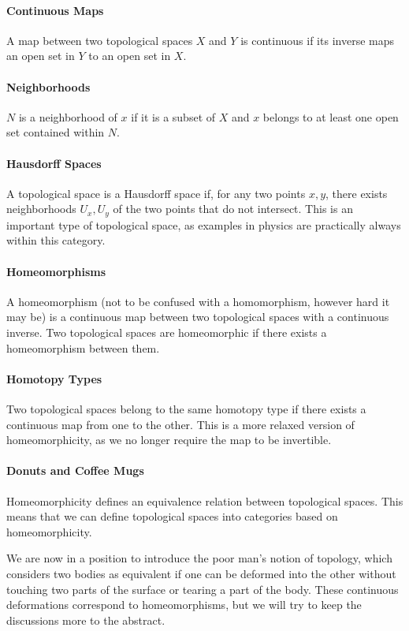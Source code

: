 \paragraph{Continuous Maps}
A map between two topological spaces $X$ and $Y$ is continuous if its inverse maps an open set in $Y$ to an open set in $X$.

\paragraph{Neighborhoods}
$N$ is a neighborhood of $x$ if it is a subset of $X$ and $x$ belongs to at least one open set contained within $N$.

\paragraph{Hausdorff Spaces}
A topological space is a Hausdorff space if, for any two points $x, y$, there exists neighborhoods $U_{x}, U_{y}$ of the two points that do not intersect. This is an important type of topological space, as examples in physics are practically always within this category.

\paragraph{Homeomorphisms}
A homeomorphism (not to be confused with a homomorphism, however hard it may be) is a continuous map between two topological spaces with a continuous inverse. Two topological spaces are homeomorphic if there exists a homeomorphism between them.

\paragraph{Homotopy Types}
Two topological spaces belong to the same homotopy type if there exists a continuous map from one to the other. This is a more relaxed version of homeomorphicity, as we no longer require the map to be invertible.

\paragraph{Donuts and Coffee Mugs}
Homeomorphicity defines an equivalence relation between topological spaces. This means that we can define topological spaces into categories based on homeomorphicity.

We are now in a position to introduce the poor man's notion of topology, which considers two bodies as equivalent if one can be deformed into the other without touching two parts of the surface or tearing a part of the body. These continuous deformations correspond to homeomorphisms, but we will try to keep the discussions more to the abstract.

